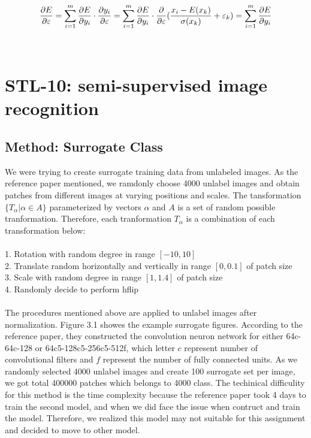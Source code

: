 \documentclass[final]{siamltexmm}
\begin{document}
\begin{equation}
{\partial E\over \partial \varepsilon}
=\sum\limits_{i=1}^{m}{\partial E\over \partial y_i}\cdot{\partial y_i\over \partial \varepsilon}
=\sum\limits_{i=1}^{m}{\partial E\over \partial y_i}\cdot{\partial \over \partial \varepsilon}{( {x_i-E(x_k)\over {\sigma(x_k)}}+\varepsilon_k )}
=\sum\limits_{i=1}^{m}{\partial E\over \partial y_i}
\end{equation}

\\
\section{STL-10: semi-supervised image recognition}
\subsection{Method: Surrogate Class}
We were trying to create surrogate training data from unlabeled images. As the reference paper mentioned, we ramdonly choose 4000 unlabel images and obtain patches from different images at varying positions and scales. The tansformation $\{T_{\alpha}|\alpha \in A\}$ parameterized by vectors $\alpha$ and $A$ is a set of random possible tranformation. Therefore, each tranformation $T_{\alpha}$ is a combination of each transformation below:\\\\

1. Rotation with random degree in range $[-10, 10]$\\
2. Translate random horizontally and vertically in range $[0, 0.1]$ of patch size\\
3. Scale with random degree in range $[1, 1.4]$ of patch size\\
4. Randomly decide to perform hflip\\\\
The procedures mentioned above are applied to unlabel images after normalization. Figure 3.1 showes the example surrogate figures. According to the reference paper, they constructed the convolution neuron network for either 64c-64c-128 or 64c5-128c5-256c5-512f, which letter $c$ represent number of convolutional filters and $f$ represent the number of fully connected units. As we randomly selected 4000 unlabel images and create 100 surrogate set per image, we got total 400000 patches which belongs to 4000 class. The techinical difficulity for this method is the time complexity because the reference paper took 4 days to train the second model, and when we did face the issue when contruct and train the model. Therefore, we realized this model may not suitable for this assignment and decided to move to other model.
\end{document}
